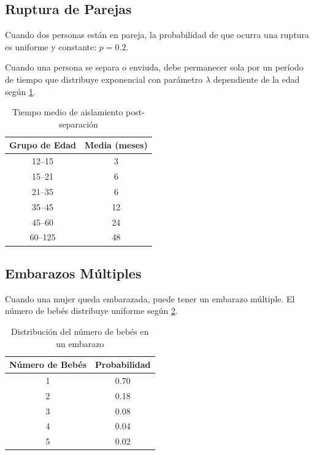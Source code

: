 \documentclass[12pt, a4paper, spanish]{report}
\begin{document}
\subsection{Ruptura de Parejas}

Cuando dos personas están en pareja, la probabilidad de que ocurra una ruptura es uniforme y constante: $p = 0.2$.

Cuando una persona se separa o enviuda, debe permanecer sola por un período de tiempo que distribuye exponencial con parámetro $\lambda$ dependiente de la edad según \ref{table:isolation_lambda}.

\begin{table}[h]
    \centering
    \caption{Tiempo medio de aislamiento post-separación}\label{table:isolation_lambda}
    \begin{tabular}{|c|c|}
    \hline
    \textbf{Grupo de Edad} & \textbf{Media (meses)} \\
    \hline
    12--15 & 3 \\
    15--21 & 6 \\
    21--35 & 6 \\
    35--45 & 12 \\
    45--60 & 24 \\
    60--125 & 48 \\
    \hline
    \end{tabular}
\end{table}

\subsection{Embarazos Múltiples}

Cuando una mujer queda embarazada, puede tener un embarazo múltiple. El número de bebés distribuye uniforme según \ref{table:multiple_births}.

\begin{table}[h]
    \centering
    \caption{Distribución del número de bebés en un embarazo}\label{table:multiple_births}
    \begin{tabular}{|c|c|}
    \hline
    \textbf{Número de Bebés} & \textbf{Probabilidad} \\
    \hline
    1 & 0.70 \\
    2 & 0.18 \\
    3 & 0.08 \\
    4 & 0.04 \\
    5 & 0.02 \\
    \hline
    \end{tabular}
\end{table}
\end{document}
